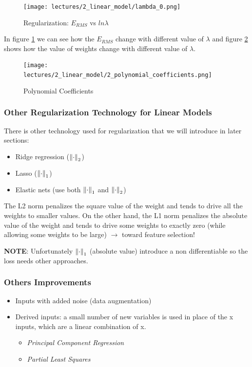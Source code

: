 \documentclass[../main.tex]{subfiles}
\begin{document}
\begin{figure}[H]
    \centering
    \texttt{[image: lectures/2\_linear\_model/lambda\_0.png]}
    \caption{Regularization: $E_{RMS}$ vs $ln\lambda$}
    \label{fig:2_lambda_0}
\end{figure}

In figure \ref{fig:2_lambda_0} we can see how the $E_{RMS}$ change with different value of $\lambda$ and figure \ref{fig:2_poly_coeff_with_reg} shows how the value of weights change with different value of $\lambda$.

\begin{figure}[H]
    \centering
    \texttt{[image: lectures/2\_linear\_model/2\_polynomial\_coefficients.png]}
    \caption{Polynomial Coefficients}
    \label{fig:2_poly_coeff_with_reg}
\end{figure}


\subsubsection{Other Regularization Technology for Linear Models}
There is other technology used for regularization that we will introduce in later sections:
\begin{itemize}
    \item Ridge regression ($\left\lVert\cdot\right\rVert_2$)
    \item Lasso ($\left\lVert\cdot\right\rVert_1$)
    \item Elastic nets (use both $\left\lVert\cdot\right\rVert_1$ and $\left\lVert\cdot\right\rVert_2$)
\end{itemize}

The L2 norm penalizes the square value of the weight and tends to drive all the weights to smaller values. On the other hand, the L1 norm penalizes the absolute value of the weight and tends to drive some weights to exactly zero (while allowing some weights to be large) $\rightarrow$ toward feature selection!

\textbf{NOTE}: Unfortunately $\left\lVert\cdot\right\rVert_1$ (absolute value) introduce a non differentiable so the loss needs other approaches.

\subsubsection{Others Improvements}
\begin{itemize}
    \item Inputs with added noise (data augmentation)
    \item Derived inputs: a small number of new variables is used in place of the x inputs, which are a linear combination of x.
    \begin{itemize}
        \item \textit{Principal Component Regression}
        \item \textit{Partial Least Squares}
    \end{itemize}
\end{itemize}
\end{document}
